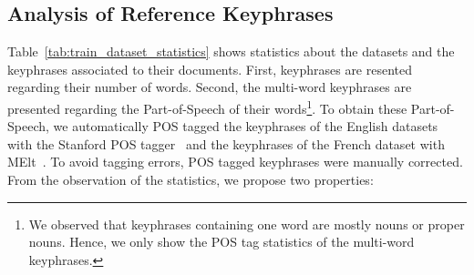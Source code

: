   \subsection{Analysis of Reference Keyphrases}
  \label{subsec:keyphrase_analysis}
    Table~\ref{tab:train_dataset_statistics} shows statistics about the datasets
    and the keyphrases associated to their documents. First, keyphrases are 
    resented regarding their number of words. Second, the multi-word keyphrases
    are presented regarding the Part-of-Speech of their words\footnote{We
    observed that keyphrases containing one word are mostly nouns or proper
    nouns. Hence, we only show the POS tag statistics of the multi-word
    keyphrases.}. To obtain these Part-of-Speech, we automatically POS tagged
    the keyphrases of the English datasets with the Stanford POS
    tagger~\cite{toutanova2003stanfordpostagger} and the keyphrases of the
    French dataset with MElt~\cite{denis2009melt}. To avoid tagging errors, POS
    tagged keyphrases were manually corrected.  From the observation of the
    statistics, we propose two properties:
